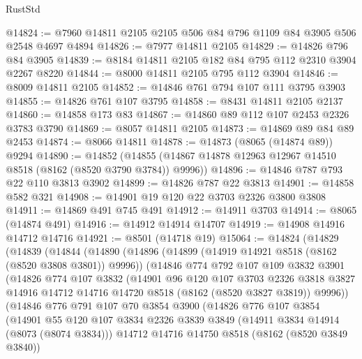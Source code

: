 \begin{lexlean}{RustStd}
\begin{coremodule}
@14824 := @7960 @14811 @2105 @2105 @506 @84 @796 @1109 @84 @3905 @506 @2548 @4697 @4894
@14826 := @7977 @14811 @2105
@14829 := @14826 @796 @84 @3905
@14839 := @8184 @14811 @2105 @182 @84 @795 @112 @2310 @3904 @2267 @8220
@14844 := @8000 @14811 @2105 @795 @112 @3904
@14846 := @8009 @14811 @2105
@14852 := @14846 @761 @794 @107 @111 @3795 @3903
@14855 := @14826 @761 @107 @3795
@14858 := @8431 @14811 @2105 @2137
@14860 := @14858 @173 @83
@14867 := @14860 @89 @112 @107 @2453 @2326 @3783 @3790
@14869 := @8057 @14811 @2105
@14873 := @14869 @89 @84 @89 @2453
@14874 := @8066 @14811
@14878 := @14873 (@8065 (@14874 @89)) @9294
@14890 := @14852
    (@14855 (@14867 @14878 @12963 @12967 @14510 @8518 (@8162 (@8520 @3790 @3784)) @9996))
@14896 := @14846 @787 @793 @22 @110 @3813 @3902
@14899 := @14826 @787 @22 @3813
@14901 := @14858 @582 @321
@14908 := @14901 @19 @120 @22 @3703 @2326 @3800 @3808
@14911 := @14869 @491 @745 @491
@14912 := @14911 @3703
@14914 := @8065 (@14874 @491)
@14916 := @14912 @14914 @14707
@14919 := @14908 @14916 @14712 @14716
@14921 := @8501 (@14718 @19)
@15064 := @14824
    (@14829
      (@14839
        (@14844
          (@14890
            (@14896
              (@14899 (@14919 @14921 @8518 (@8162 (@8520 @3808 @3801)) @9996))
              (@14846
                @774
                @792
                @107
                @109
                @3832
                @3901
                (@14826
                  @774
                  @107
                  @3832
                  (@14901
                    @96
                    @120
                    @107
                    @3703
                    @2326
                    @3818
                    @3827
                    @14916
                    @14712
                    @14716
                    @14720
                    @8518
                    (@8162 (@8520 @3827 @3819))
                    @9996))
                (@14846
                  @776
                  @791
                  @107
                  @70
                  @3854
                  @3900
                  (@14826
                    @776
                    @107
                    @3854
                    (@14901
                      @55
                      @120
                      @107
                      @3834
                      @2326
                      @3839
                      @3849
                      (@14911 @3834 @14914 (@8073 (@8074 @3834)))
                      @14712
                      @14716
                      @14750
                      @8518
                      (@8162 (@8520 @3849 @3840))

\end{coremodule}
\end{lexlean}

